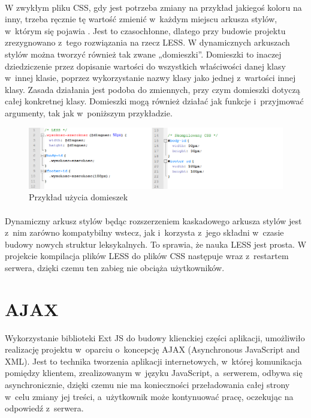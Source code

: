 \paragraph{}
W zwykłym pliku CSS, gdy jest potrzeba zmiany na przykład jakiegoś koloru na inny, trzeba ręcznie tę wartość zmienić w~każdym miejscu arkusza stylów, w~którym się pojawia \cite{cssBook}. Jest to czasochłonne, dlatego przy budowie projektu zrezygnowano z~tego rozwiązania na rzecz LESS. 
W dynamicznych arkuszach stylów można tworzyć również tak zwane „domieszki”. Domieszki to inaczej dziedziczenie przez dopisanie wartości do wszystkich właściwości danej klasy w~innej klasie, poprzez wykorzystanie nazwy klasy jako jednej z~wartości innej klasy. Zasada działania jest podoba do zmiennych, przy czym domieszki dotyczą całej konkretnej klasy. Domieszki mogą również działać jak funkcje i~przyjmować argumenty, tak jak w~poniższym przykładzie.

\begin{figure}[h]
	\centering
	\includegraphics[width=1.00\textwidth]{images/less2.png}
	\caption{Przykład użycia domieszek}
\end{figure}
\paragraph{}

Dynamiczny arkusz stylów  będąc rozszerzeniem kaskadowego arkusza stylów jest z~nim zarówno kompatybilny wstecz, jak i~korzysta z~jego składni w~czasie budowy nowych struktur leksykalnych. To sprawia, że nauka LESS jest prosta.
W projekcie kompilacja plików LESS do plików CSS następuje wraz z~restartem serwera, dzięki czemu ten zabieg nie obciąża użytkowników. \cite{LESS}


\section{AJAX}
Wykorzystanie biblioteki Ext JS do budowy klienckiej części aplikacji, umożliwiło realizację projektu w~oparciu o~koncepcję AJAX (Asynchronous JavaScript and XML). Jest to technika tworzenia aplikacji internetowych, w~której komunikacja pomiędzy klientem, zrealizowanym w~języku JavaScript, a~serwerem, odbywa się asynchronicznie, dzięki czemu nie ma konieczności przeładowania całej strony w~celu zmiany jej treści, a~użytkownik może kontynuować pracę, oczekując na odpowiedź z~serwera.\cite{ajaxWoj}

